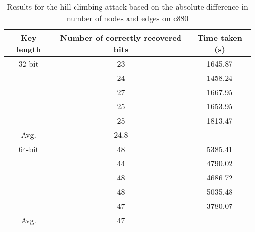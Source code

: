\begin{table}
\caption{Results for the hill-climbing attack based on the absolute difference in number of nodes and edges on c880}
\begin{tabular}{ | c | c | c | }
\hline
Key length & Number of correctly recovered bits & Time taken (s) \\
\hline
32-bit & 23&                                                         1645.87\\
&24&                                                         1458.24\\
&27&                                                         1667.95\\
&25&                                                         1653.95\\
&25&                                                         1813.47\\
Avg. & 24.8 &\\
\hline
64-bit & 48 &                                                         5385.41 \\
& 44 &                                                         4790.02 \\
&48&                                                         4686.72 \\
&48&                                                         5035.48 \\
& 47&                                                         3780.07\\
Avg. & 47&\\
\hline
\end{tabular}
\end{table}


